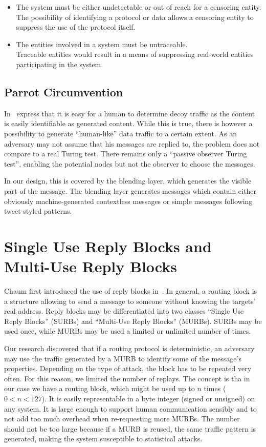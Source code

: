 \begin{itemize}
	\item The system must be either undetectable or out of reach for a censoring entity.\\
	The possibility of identifying a protocol or data allows a censoring entity to suppress the use of the protocol itself. 
	\item The entities involved in a system must be untraceable.\\
	Traceable entities would result in a means of suppressing real-world entities participating in the system.
\end{itemize}

\subsection{Parrot Circumvention}
In~\cite{oakland2013-parrot} \citeauthor{oakland2013-parrot} express that it is easy for a human to determine decoy traffic as the content is easily identifiable as generated content. While this is true, there is however a possibility to generate ``human-like'' data traffic to a certain extent. As an adversary may not assume that his messages are replied to, the problem does not compare to a real Turing test. There remains only a ``passive observer Turing test'', enabling the potential nodes but not the observer to choose the messages. 

In our design, this is covered by the blending layer, which generates the visible part of the message. The blending layer generates messages which contain either obviously machine-generated contextless messages or simple messages following tweet-styled patterns. 

\section{Single Use Reply Blocks and Multi-Use Reply Blocks}
Chaum first introduced the use of reply blocks in~\cite{CHAUM1}. In general, a routing block is a structure allowing to send a message to someone without knowing the targets' real address. Reply blocks may be differentiated into two classes ``Single Use Reply Blocks'' (SURBs)  and ``Multi-Use Reply Blocks'' (MURBs). SURBs may be used once, while MURBs may be used a limited or unlimited number of times. 

Our research discovered that if a routing protocol is deterministic, an adversary may use the traffic generated by a MURB to identify some of the message's properties. Depending on the type of attack, the block has to be repeated very often. For this reason, we limited the number of replays. The concept is tha in our case we have a routing block, which might be used up to $n$ times ($0<n<127$). It is easily representable in a byte integer (signed or unsigned) on any system. It is large enough to support human communication sensibly and to not add too much overhead when re-requesting more MURBs. The number should not be too large because if a MURB is reused, the same traffic pattern is generated, making the system susceptible to statistical attacks.

